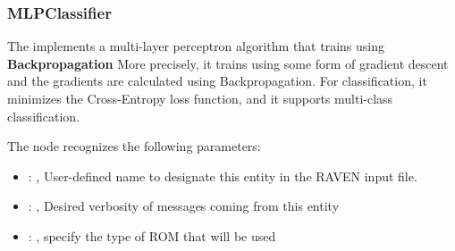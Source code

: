 \subsubsection{MLPClassifier}
  The  implements a multi-layer perceptron algorithm that trains using
  \textbf{Backpropagation}                             More precisely, it trains using some form of
  gradient descent and the gradients are calculated using Backpropagation.
  For classification, it minimizes the Cross-Entropy loss function, and it supports multi-class
  classification.                             

  The  node recognizes the following parameters:
    \begin{itemize}
      \item {}: , 
        User-defined name to designate this entity in the RAVEN input file.
      \item {}: , 
        Desired verbosity of messages coming from this entity
      \item {}: , 
        specify the type of ROM that will be used
  \end{itemize}

